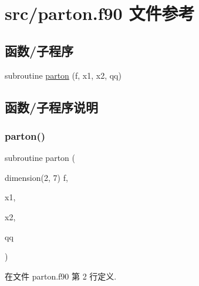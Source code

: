 \hypertarget{parton_8f90}{}\section{src/parton.f90 文件参考}
\label{parton_8f90}
\subsection*{函数/子程序}
\begin{DoxyCompactItemize}
\item 
subroutine \mbox{\hyperlink{parton_8f90_a3b6487bad48aa8ef534f4d1b31eff181}{parton}} (f, x1, x2, qq)
\end{DoxyCompactItemize}


\subsection{函数/子程序说明}
\mbox{\label{parton_8f90_a3b6487bad48aa8ef534f4d1b31eff181}} 
\subsubsection{\texorpdfstring{parton()}{parton()}}
{\footnotesize\ttfamily subroutine parton (\begin{DoxyParamCaption}\item[{dimension(2, 7)}]{f,  }\item[{}]{x1,  }\item[{}]{x2,  }\item[{}]{qq }\end{DoxyParamCaption})}



在文件 parton.\+f90 第 2 行定义.

